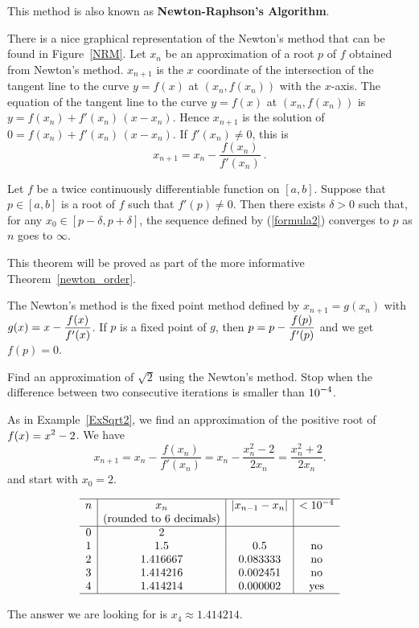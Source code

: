 This method is also known as
{\bfseries Newton-Raphson's Algorithm}.

There is a nice graphical representation of the Newton's method
that can be found in Figure~\ref{NRM}.  Let $x_n$ be an
approximation of a root $p$ of $f$ obtained from Newton's method.
$x_{n+1}$ is the $x$ coordinate of the intersection of the
tangent line to the curve $y=f(x)$ at $(x_n,f(x_n))$ with the
$x$-axis.  The equation of the tangent line to the curve $y=f(x)$ at
$(x_n,f(x_n))$ is $y=f(x_n)+f'(x_n)\,(x-x_n)$.  Hence $x_{n+1}$ is the
solution of $0 = f(x_n)+f'(x_n)\,(x-x_n)$.  If $f'(x_n)\not=0$, this
is
\[
x_{n+1} = x_n-\frac{f(x_n)}{f'(x_n)} \ .
\]


\begin{theorem}
Let $f$ be a twice continuously differentiable function on $[a,b]$.
Suppose that $p \in [a,b]$ is a root of $f$ such that $f'(p) \neq 0$.
Then there exists $\delta > 0$ such that, for any
$x_0 \in [p-\delta, p + \delta]$, the sequence defined by
(\ref{formula2}) converges to $p$ as $n$ goes to $\infty$.
\end{theorem}

This theorem will be proved as part of the more informative
Theorem~\ref{newton_order}.

\begin{rmk} The Newton's method is the fixed point method
defined by $x_{n+1}=g(x_n)$ with
$\displaystyle g(x)=x - \frac{f(x)}{f'(x)}$.  If $p$ is a fixed point
of $g$, then $\displaystyle p = p - \frac{f(p)}{f'(p)}$ and we get
$f(p) = 0$.
\end{rmk}

\begin{egg}
Find an approximation of $\sqrt{2}$ using the Newton's method.
Stop when the difference between two consecutive iterations is smaller
than $\displaystyle 10^{-4}$.

As in Example~\ref{ExSqrt2}, we find an approximation of the
positive root of $\displaystyle f(x) = x^2 - 2$.  We have
\[
x_{n+1} = x_n - \frac{f(x_n)}{f'(x_n)}
= x_n - \frac{x_n^2-2}{2 x_n}
= \frac{x_n^2+2}{2 x_n}.
\]
and start with $x_0=2$.

\[
\begin{array}{c|c|c|c}
\hline
n & x_n & |x_{n-1}-x_n| & < 10^{-4} \\
& \text{(rounded to 6 decimals)} & & \\  
\hline
0 & 2 & & \\
1 & 1.5 & 0.5 & \text{no} \\
2 & 1.416667 & 0.083333 & \text{no} \\
3 & 1.414216 & 0.002451 & \text{no} \\
4 & 1.414214 & 0.000002 & \text{yes} \\
\hline
\end{array}
\]

The answer we are looking for is $x_4 \approx 1.414214$.
\end{egg}

